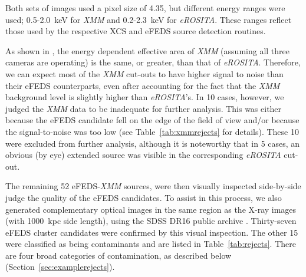 \documentclass[fleqn,usenatbib]{mnras}
\begin{document}
Both sets of images used a pixel size of 4.35\arcsec, but different energy ranges were used; 0.5-2.0~keV for {\em XMM} and 0.2-2.3~keV for {\em eROSITA}. These ranges reflect those used by the respective XCS and eFEDS source detection routines.  

As shown in \cite{missionpaper}, the energy dependent effective area of {\em XMM} (assuming all three cameras are operating) is the same, or greater, than that of {\em eROSITA}. Therefore, we can expect most of the {\em XMM} cut-outs to have higher signal to noise than their eFEDS counterparts, even after accounting for the fact that the {\em XMM} background level is slightly higher than {\em eROSITA}'s. In 10 cases, however, we judged the {\em XMM} data to be inadequate for further analysis. This was either because the eFEDS candidate fell on the edge of the field of view and/or because the signal-to-noise was too low (see Table~\ref{tab:xmmrejects} for details). These 10 were excluded from further analysis, although it is noteworthy that in 5 cases, an obvious (by eye) extended source was visible in the corresponding {\em eROSITA} cut-out.


The remaining 52 eFEDS-{\em XMM} sources, were then visually inspected side-by-side judge the quality of the eFEDS candidates. To assist in this process, we also generated complementary optical images in the same region as the X-ray images (with 1000~kpc side length), using the SDSS DR16 public archive \citep[][]{dr16}.   
Thirty-seven eFEDS cluster candidates were confirmed by this visual inspection. The other 15 were classified as being contaminants and are listed in Table~\ref{tab:rejects}. There are four broad categories of contamination, as described below (Section~\ref{sec:examplerejects}).
\end{document}
